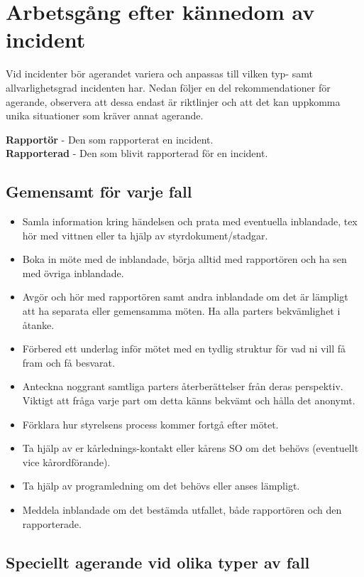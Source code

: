 \section{Arbetsgång efter kännedom av incident}
Vid incidenter bör agerandet variera och anpassas till vilken typ- samt allvarlighetsgrad incidenten har. Nedan följer en del rekommendationer för agerande, observera att dessa endast är riktlinjer och att det kan uppkomma unika situationer som kräver annat agerande. 

\textbf{Rapportör} - Den som rapporterat en incident. \\
\textbf{Rapporterad} - Den som blivit rapporterad för en incident. 

\subsection{Gemensamt för varje fall}

\begin{itemize}
    \item Samla information kring händelsen och prata med eventuella inblandade, tex hör med vittnen eller ta hjälp av styrdokument/stadgar. 
    \item Boka in möte med de inblandade, börja alltid med rapportören och ha sen med övriga inblandade.
    \item Avgör och hör med rapportören samt andra inblandade om det är lämpligt att ha separata eller gemensamma möten. Ha alla parters bekvämlighet i åtanke. 
    \item Förbered ett underlag inför mötet med en tydlig struktur för vad ni vill få fram och få besvarat. 
    \item Anteckna noggrant samtliga parters återberättelser från deras perspektiv. Viktigt att fråga varje part om detta känns bekvämt och hålla det anonymt. 
    \item Förklara hur styrelsens process kommer fortgå efter mötet. 
    \item Ta hjälp av er kårlednings-kontakt eller kårens SO om det behövs (eventuellt vice kårordförande). 
    \item Ta hjälp av programledning om det behövs eller anses lämpligt.
    \item Meddela inblandade om det bestämda utfallet, både rapportören och den rapporterade. 
\end{itemize}

\subsection{Speciellt agerande vid olika typer av fall}

